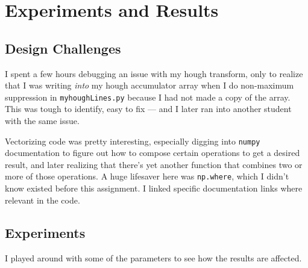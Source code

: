 \section{Experiments and Results}

\subsection{Design Challenges}
\begin{enumroman}
  \item I spent a few hours debugging an issue with my hough transform,
    only to realize that I was writing \emph{into} my hough accumulator array
    when I do non-maximum suppression in \verb|myhoughLines.py| because I had not
    made a copy of the array.
    This was tough to identify, easy to fix --- and I later ran into another student with the same issue.
  \item Vectorizing code was pretty interesting,
    especially digging into \verb|numpy| documentation to figure out how to
    compose certain operations to get a desired result,
    and later realizing that there's yet another function that
    combines two or more of those operations.
    A huge lifesaver here was \verb|np.where|, which I didn't know existed
    before this assignment.
    I linked specific documentation links where relevant in the code.
\end{enumroman}

\subsection{Experiments}

I played around with some of the parameters to see how the results
are affected.

